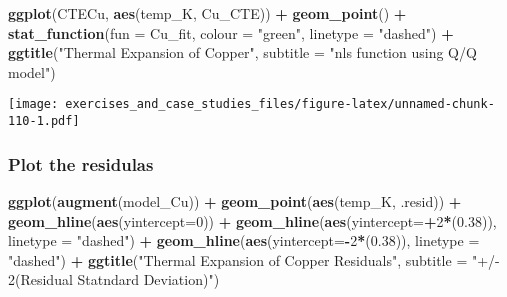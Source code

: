 \documentclass[]{book}
\newenvironment{Shaded}{\begin{snugshade}}{\end{snugshade}}
\newcommand{\DataTypeTok}[1]{\textcolor[rgb]{0.13,0.29,0.53}{#1}}
\newcommand{\DecValTok}[1]{\textcolor[rgb]{0.00,0.00,0.81}{#1}}
\newcommand{\FloatTok}[1]{\textcolor[rgb]{0.00,0.00,0.81}{#1}}
\newcommand{\KeywordTok}[1]{\textcolor[rgb]{0.13,0.29,0.53}{\textbf{#1}}}
\newcommand{\NormalTok}[1]{#1}
\newcommand{\OperatorTok}[1]{\textcolor[rgb]{0.81,0.36,0.00}{\textbf{#1}}}
\newcommand{\StringTok}[1]{\textcolor[rgb]{0.31,0.60,0.02}{#1}}
\theoremstyle{definition}
\theoremstyle{definition}
\theoremstyle{definition}
\theoremstyle{remark}
\begin{document}
\begin{Shaded}
\begin{Highlighting}[]
\KeywordTok{ggplot}\NormalTok{(CTECu, }\KeywordTok{aes}\NormalTok{(temp_K, Cu_CTE)) }\OperatorTok{+}\StringTok{ }
\StringTok{  }\KeywordTok{geom_point}\NormalTok{() }\OperatorTok{+}\StringTok{ }
\StringTok{  }\KeywordTok{stat_function}\NormalTok{(}\DataTypeTok{fun =}\NormalTok{ Cu_fit, }\DataTypeTok{colour =} \StringTok{"green"}\NormalTok{, }\DataTypeTok{linetype =} \StringTok{"dashed"}\NormalTok{) }\OperatorTok{+}
\StringTok{  }\KeywordTok{ggtitle}\NormalTok{(}\StringTok{"Thermal Expansion of Copper"}\NormalTok{, }\DataTypeTok{subtitle =} \StringTok{"nls function using Q/Q model"}\NormalTok{)}
\end{Highlighting}
\end{Shaded}

\texttt{[image: exercises\_and\_case\_studies\_files/figure-latex/unnamed-chunk-110-1.pdf]}

\hypertarget{plot-the-residulas}{%
\subsubsection{Plot the residulas}\label{plot-the-residulas}}

\begin{Shaded}
\begin{Highlighting}[]
\KeywordTok{ggplot}\NormalTok{(}\KeywordTok{augment}\NormalTok{(model_Cu)) }\OperatorTok{+}
\StringTok{  }\KeywordTok{geom_point}\NormalTok{(}\KeywordTok{aes}\NormalTok{(temp_K, .resid)) }\OperatorTok{+}
\StringTok{  }\KeywordTok{geom_hline}\NormalTok{(}\KeywordTok{aes}\NormalTok{(}\DataTypeTok{yintercept=}\DecValTok{0}\NormalTok{)) }\OperatorTok{+}
\StringTok{  }\KeywordTok{geom_hline}\NormalTok{(}\KeywordTok{aes}\NormalTok{(}\DataTypeTok{yintercept=}\OperatorTok{+}\DecValTok{2}\OperatorTok{*}\NormalTok{(}\FloatTok{0.38}\NormalTok{)), }\DataTypeTok{linetype =} \StringTok{"dashed"}\NormalTok{) }\OperatorTok{+}
\StringTok{  }\KeywordTok{geom_hline}\NormalTok{(}\KeywordTok{aes}\NormalTok{(}\DataTypeTok{yintercept=}\OperatorTok{-}\DecValTok{2}\OperatorTok{*}\NormalTok{(}\FloatTok{0.38}\NormalTok{)), }\DataTypeTok{linetype =} \StringTok{"dashed"}\NormalTok{) }\OperatorTok{+}
\StringTok{  }\KeywordTok{ggtitle}\NormalTok{(}\StringTok{"Thermal Expansion of Copper Residuals"}\NormalTok{, }\DataTypeTok{subtitle =} \StringTok{"+/- 2(Residual Statndard Deviation)"}\NormalTok{)}
\end{Highlighting}
\end{Shaded}
\end{document}

